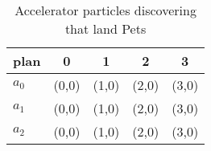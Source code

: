 \documentclass[a4paper]{article}
\begin{document}
\begin{table}
\begin{adjustbox}{width=0.5\columnwidth}
\begin{tabular}{|l|l|l|l|l|}
\hline
\textbf{plan} & \multicolumn{1}{c|}{\textbf{0}} & \multicolumn{1}{c|}{\textbf{1}} & \multicolumn{1}{c|}{\textbf{2}} & \multicolumn{1}{c|}{\textbf{3}} \\ \hline
\textbf{$a_0$}  & (0,0) & (1,0) & (2,0) & (3,0) \\ \hline
\textbf{$a_1$}  & (0,0) & (1,0) & (2,0) & (3,0) \\ \hline
\textbf{$a_2$}  & (0,0) & (1,0) & (2,0) & (3,0) \\ \hline
\end{tabular}
\end{adjustbox}
\caption{Accelerator particles discovering that land Pets 
}
\end{table}
\end{document}

